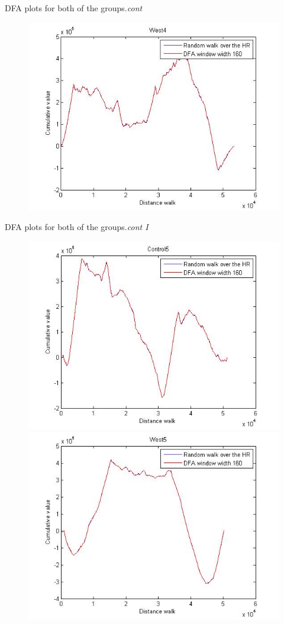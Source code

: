 \documentclass[t,12pt,english
\ifx\beamermode\undefined\else,\beamermode\fi
]{beamer}
\begin{document}
\begin{frame}{DFA plots for both of the groups.\textit{cont}}
\begin{figure}[!htbp]
\includegraphics[width=.7\textwidth]{E11.jpg}\\
\endminipage\hfill
\end{figure}

    
\end{frame}

\begin{frame}{DFA plots for both of the groups.\textit{cont I}}

\begin{figure}[!htbp]
%
\centering
\includegraphics[width=.7\textwidth]{E7.jpg}\\
\endminipage\hfill
{}%
\centering
\includegraphics[width=.7\textwidth]{E12.jpg}\\
\endminipage\hfill
\end{figure}

    
\end{frame}
\end{document}
